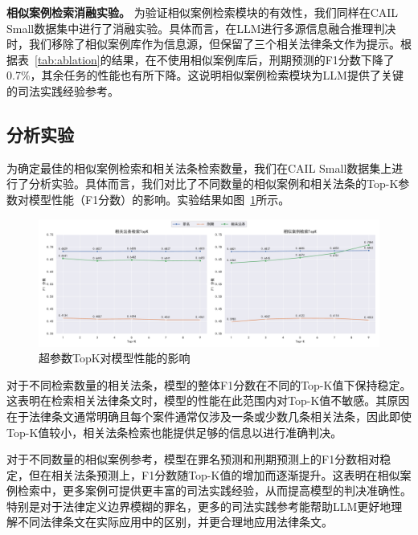 \textbf{相似案例检索消融实验。}
为验证相似案例检索模块的有效性，我们同样在CAIL Small数据集中进行了消融实验。具体而言，在LLM进行多源信息融合推理判决时，我们移除了相似案例库作为信息源，但保留了三个相关法律条文作为提示。根据表~\ref{tab:ablation}的结果，在不使用相似案例库后，刑期预测的F1分数下降了0.7\%，其余任务的性能也有所下降。这说明相似案例检索模块为LLM提供了关键的司法实践经验参考。


\subsection{\heiti 分析实验}
为确定最佳的相似案例检索和相关法条检索数量，我们在CAIL Small数据集上进行了分析实验。具体而言，我们对比了不同数量的相似案例和相关法条的Top-K参数对模型性能（F1分数）的影响。实验结果如图~\ref{fig:analysis}所示。

\begin{figure}[htpb]
	\centering
	\includegraphics[width=1\linewidth]{fig/analysis.pdf}
	\caption{超参数TopK对模型性能的影响}
	\label{fig:analysis}
\end{figure}

对于不同检索数量的相关法条，模型的整体F1分数在不同的Top-K值下保持稳定。这表明在检索相关法律条文时，模型的性能在此范围内对Top-K值不敏感。其原因在于法律条文通常明确且每个案件通常仅涉及一条或少数几条相关法条，因此即使Top-K值较小，相关法条检索也能提供足够的信息以进行准确判决。

对于不同数量的相似案例参考，模型在罪名预测和刑期预测上的F1分数相对稳定，但在相关法条预测上，F1分数随Top-K值的增加而逐渐提升。这表明在相似案例检索中，更多案例可提供更丰富的司法实践经验，从而提高模型的判决准确性。特别是对于法律定义边界模糊的罪名，更多的司法实践参考能帮助LLM更好地理解不同法律条文在实际应用中的区别，并更合理地应用法律条文。

